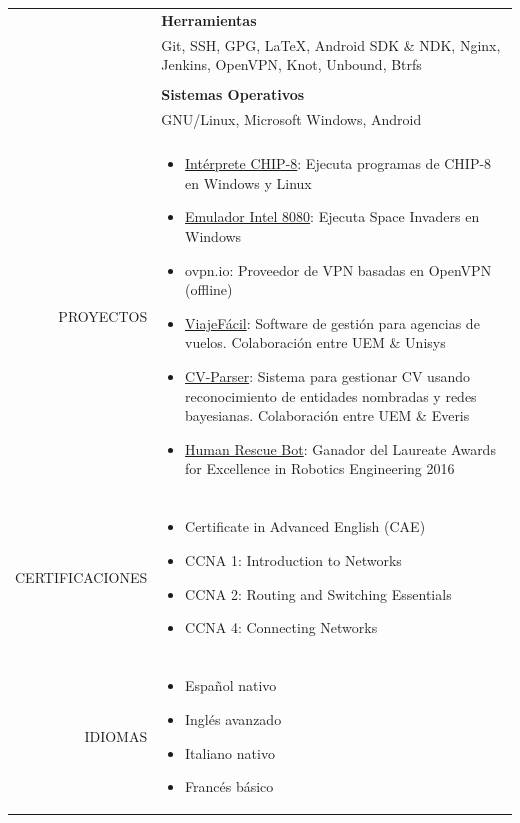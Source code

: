 \documentclass[a4paper, 11pt]{article}
\begin{document}
\begin{longtable}{rp{11cm}}
    & {\bf Herramientas}\\
    & Git, SSH, GPG, \LaTeX, Android SDK \& NDK, Nginx, Jenkins, OpenVPN, Knot, Unbound, Btrfs\\
    \\
    & {\bf Sistemas Operativos}\\
    & GNU/Linux, Microsoft Windows, Android\\
    \\
    PROYECTOS
    & \vspace{-8mm}
    \begin{itemize}[leftmargin=0cm,label={}]
        \item \href{https://github.com/hugo19941994/CHIP8-Emu}{Intérprete CHIP-8}: Ejecuta programas de CHIP-8 en Windows y Linux
        \item \href{https://github.com/hugo19941994/SpaceInvaders-Emu}{Emulador Intel 8080}: Ejecuta Space Invaders en Windows
        \item ovpn.io: Proveedor de VPN basadas en OpenVPN (offline)
        \item \href{https://github.com/hugo19941994/ViajeFacil}{ViajeFácil}: Software de gestión para agencias de vuelos. Colaboración entre UEM \& Unisys
        \item \href{https://github.com/hugo19941994/CV-Parser}{CV-Parser}: Sistema para gestionar CV usando reconocimiento de entidades nombradas y redes bayesianas. Colaboración entre UEM \& Everis
        \item \href{https://github.com/hugo19941994/robot}{Human Rescue Bot}: Ganador del Laureate Awards for Excellence in Robotics Engineering 2016
    \end{itemize}\\
    \\
    CERTIFICACIONES
    & \vspace{-8mm}
    \begin{itemize}[leftmargin=0cm,label={},noitemsep]
        \item Certificate in Advanced English (CAE)
        \item CCNA 1: Introduction to Networks
        \item CCNA 2: Routing and Switching Essentials
        \item CCNA 4: Connecting Networks
    \end{itemize}\\
    \\
    IDIOMAS
    & \vspace{-8mm}
    \begin{itemize}[leftmargin=0cm,label={},noitemsep]
        \item Español nativo
        \item Inglés avanzado
        \item Italiano nativo
        \item Francés básico
    \end{itemize}
\end{longtable}
\end{document}
